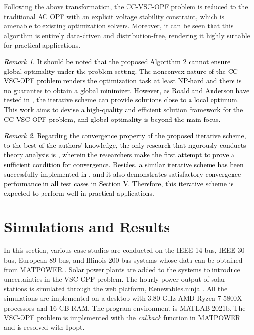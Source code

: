 \documentclass[journal]{IEEEtran}
\theoremstyle{definition}
\theoremstyle{remark}
\newtheorem{remark}{Remark}
\begin{document}
Following the above transformation, the CC-VSC-OPF problem is reduced to the traditional AC OPF with an explicit voltage stability constraint, which is amenable to existing optimization solvers.
Moreover, it can be seen that this algorithm is entirely data-driven and distribution-free, rendering it highly suitable for practical applications.
\textcolor{black}{
\begin{remark}
    It should be noted that the proposed Algorithm 2 cannot ensure global optimality under the problem setting. The nonconvex nature of the CC-VSC-OPF problem renders the optimization task at least NP-hard and there is no guarantee to obtain a global minimizer. However, as Roald and Anderson have tested in \cite{roald2018chance}, the iterative scheme can provide solutions close to a local optimum. This work aims to devise a high-quality and efficient solution framework for the CC-VSC-OPF problem, and global optimality is beyond the main focus.
\end{remark}
\begin{remark}
    Regarding the convergence property of the proposed iterative scheme, to the best of the authors' knowledge, the only research that rigorously conducts theory analysis is \cite{brust2022con}, wherein the researchers make the first attempt to prove a sufficient condition for convergence. Besides, a similar iterative scheme has been successfully implemented in \cite{roald2018chance,xu2021iterative}, and it also demonstrates satisfactory convergence performance in all test cases in Section V. Therefore, this iterative scheme is expected to perform well in practical applications.
\end{remark}
}
\section{Simulations and Results}\label{simulation}
In this section, various case studies are conducted on the IEEE 14-bus, IEEE 30-bus, European 89-bus, and Illinois 200-bus systems whose data can be obtained from MATPOWER \cite{zimmer2011matpower}. Solar power plants are added to the systems to introduce uncertainties in the VSC-OPF problem. The hourly power output of solar stations is simulated through the web platform, Renewables.ninja \cite{pfenninger2016long}. 
All the simulations are implemented on a desktop with 3.80-GHz AMD Ryzen 7 5800X processors and 16 GB RAM. The program environment is MATLAB 2021b. The VSC-OPF problem is implemented with the \textit{callback} function in MATPOWER and is resolved with Ipopt.
\vspace{-10pt}
\end{document}
